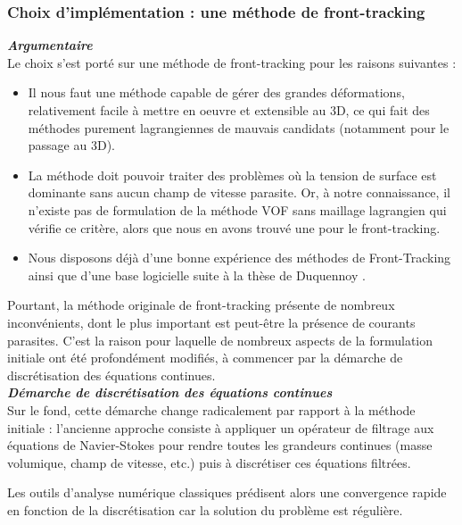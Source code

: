 \subsubsection{Choix d'impl\'ementation : une m\'ethode de front-tracking}

\textit{\textbf{Argumentaire}}
\smallskip \\
Le choix s'est port\'e sur une m\'ethode de front-tracking pour les raisons suivantes :
\begin{itemize}
  \item Il nous faut une m\'ethode capable de g\'erer des grandes d\'eformations,
        relativement facile \`a mettre en oeuvre et extensible au 3D,
        ce qui fait des m\'ethodes purement lagrangiennes de mauvais candidats (notamment pour le passage au 3D).
  \item La m\'ethode doit pouvoir traiter des probl\`emes o\`u la tension de surface
        est dominante sans aucun champ de vitesse parasite.
        Or, \`a notre connaissance, il n'existe pas de formulation de la m\'ethode VOF sans maillage lagrangien
        qui v\'erifie ce critère, alors que nous en avons trouv\'e une pour le front-tracking.
  \item Nous disposons d\'ej\`a d'une bonne exp\'erience des m\'ethodes de Front-Tracking
        ainsi que d'une base logicielle suite \`a la th\`ese de Duquennoy \cite{Duquennoy2000}.
\end{itemize}

Pourtant, la m\'ethode originale de front-tracking pr\'esente de nombreux inconv\'enients,
dont le plus important est peut-\^etre la pr\'esence de courants parasites.
C'est la raison pour laquelle de nombreux aspects de la formulation initiale ont \'et\'e profond\'ement modifi\'es,
\`a commencer par la d\'emarche de discr\'etisation des \'equations continues.
\smallskip \\

\textit{\textbf{D\'emarche de discr\'etisation des \'equations continues}}
\smallskip \\

Sur le fond, cette d\'emarche change radicalement par rapport \`a la m\'ethode initiale \cite{Unverdi1992} :
l'ancienne approche consiste \`a appliquer un op\'erateur de filtrage aux \'equations de Navier-Stokes
pour rendre toutes les grandeurs continues (masse volumique, champ de vitesse, etc.)
puis \`a discr\'etiser ces \'equations filtr\'ees.

Les outils d'analyse num\'erique classiques pr\'edisent alors une convergence rapide en fonction de la
discr\'etisation car la solution du probl\`eme est r\'eguli\`ere.\\


